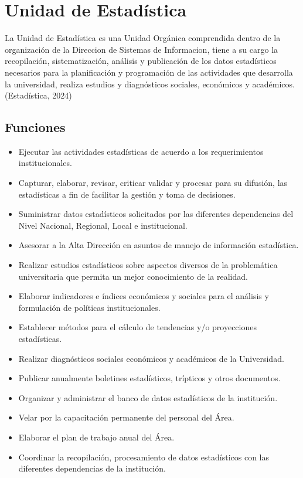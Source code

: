 \documentclass[
  12pt,
  letterpaper,
]{scrreprt}
\providecommand{\tightlist}{%
  \setlength{\itemsep}{0pt}\setlength{\parskip}{0pt}}\usepackage{longtable,booktabs,array}
\begin{document}

\chapter{Unidad de Estadística}\label{unidad-de-estaduxedstica}

La Unidad de Estadística es una Unidad Orgánica comprendida dentro de la
organización de la Direccion de Sistemas de Informacion, tiene a su
cargo la recopilación, sistematización, análisis y publicación de los
datos estadísticos necesarios para la planificación y programación de
las actividades que desarrolla la universidad, realiza estudios y
diagnósticos sociales, económicos y académicos.(Estadística, 2024)

\section{Funciones}\label{funciones}

\begin{itemize}
\tightlist
\item
  Ejecutar las actividades estadísticas de acuerdo a los requerimientos
  institucionales.
\item
  Capturar, elaborar, revisar, criticar validar y procesar para su
  difusión, las estadísticas a fin de facilitar la gestión y toma de
  decisiones.
\item
  Suministrar datos estadísticos solicitados por las diferentes
  dependencias del Nivel Nacional, Regional, Local e institucional.
\item
  Asesorar a la Alta Dirección en asuntos de manejo de información
  estadística.
\item
  Realizar estudios estadísticos sobre aspectos diversos de la
  problemática universitaria que permita un mejor conocimiento de la
  realidad.
\item
  Elaborar indicadores e índices económicos y sociales para el análisis
  y formulación de políticas institucionales.
\item
  Establecer métodos para el cálculo de tendencias y/o proyecciones
  estadísticas.
\item
  Realizar diagnósticos sociales económicos y académicos de la
  Universidad.
\item
  Publicar anualmente boletines estadísticos, trípticos y otros
  documentos.
\item
  Organizar y administrar el banco de datos estadísticos de la
  institución.
\item
  Velar por la capacitación permanente del personal del Área.
\item
  Elaborar el plan de trabajo anual del Área.
\item
  Coordinar la recopilación, procesamiento de datos estadísticos con las
  diferentes dependencias de la institución.
\end{itemize}
\end{document}
